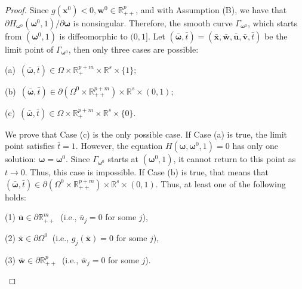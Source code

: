 \documentclass[11pt,pdflatex,sn-mathphys-ay]{sn-jnl}%
\theoremstyle{definition}
\theoremstyle{thmstyleone}%
\theoremstyle{thmstyletwo}%
\theoremstyle{thmstylethree}%
\newcounter{cases}
\begin{document}
\begin{proof}
		Since $g(\bm{x}^0)<0, \textbf{w}^0 \in \mathbb{R}_{++}^{p}$, and with Assumption (B),  we have that  $\partial H_{\bm{\omega}^0}( \bm{\omega} ^0, 1)/\partial \bm{\omega}$ is nonsingular. Therefore, the smooth curve
		$\Gamma_{\bm{\omega}^0}$, which starts from $(\bm{\omega}^0, 1)$ is diffeomorphic to $(0, 1]$. Let
		$(\bar{\bm{\omega}}, \bar t)=
		(\bar{\bm{x}}, \bar{\textbf{w}}, \bar{\bm{u}}, \bar{\bm{v}}, \bar t)$ be the limit point of $\Gamma_{\bm{\omega}^0}$, then only three cases are possible:
		\begin{description}
			\item (a)~$(\bar{\bm{\omega}}, \bar t) \in \Omega \times
			\mathbb{R}^{p+m}_{+}\times \mathbb{R}^s\times \{1\};$
			\item (b)~$(\bar{\bm{\omega}}, \bar t) \in \partial (\Omega^0\times
			\mathbb{R}^{p+m}_{++})\times \mathbb{R}^s\times (0,1);$
			\item (c)~$(\bar{\bm{\omega}}, \bar t)\in \Omega \times
			\mathbb{R}^{p+m}_{+}\times \mathbb{R}^s\times \{0\}.$
		\end{description}
		We prove that Case (c) is the only possible case.
		If Case (a) is true, the limit point satisfies $\bar{t} = 1$. However, the equation $H(\bm{\omega}, \bm{\omega}^0, 1) = 0$ has only one solution: $\bm{\omega} = \bm{\omega}^0$. Since $\Gamma_{\bm{\omega}^0}$ starts at $(\bm{\omega}^0, 1)$, it cannot return to this point as $t \to 0$. Thus, this case is impossible.
		If Case (b) is true, that means that $(\bar{\bm{\omega}}, \bar t) \in \partial (\Omega^0\times \mathbb{R}^{p+m}_{++})\times \mathbb{R}^s\times (0,1).$ 
		Thus, at least one of the following holds:
		\begin{description}
			\item (1) $\bar{\bm{u}} \in \partial \mathbb{R}^m_{++}~$ (i.e., $\bar{u}_j = 0$ for some $j$),
			\item (2) $\bar{\bm{x}} \in \partial \Omega^0~$ (i.e., $g_j(\bar{\bm{x}}) = 0$ for some $j$),
			\item (3) $\bar{\textbf{w}} \in \partial \mathbb{R}^p_{++}~$ (i.e., $\bar{\text{w}}_j = 0$ for some $j$).
		\end{description}
		

\end{proof}
\end{document}

